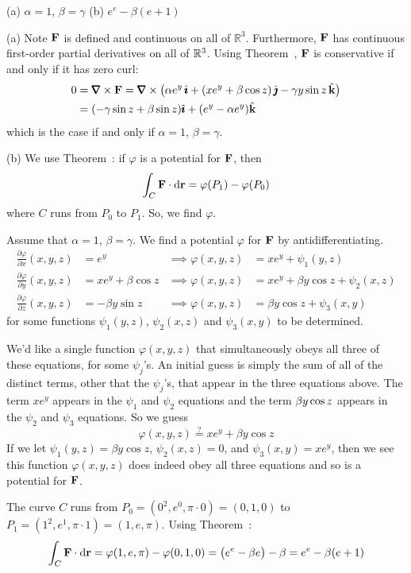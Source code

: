 \begin{answer} 
(a) $\alpha=1$, $\beta=\gamma$\qquad
(b) $e^e-\beta(e+1)$
\end{answer}


\begin{solution}
(a)
Note $\mathbf{F}$ is defined and continuous on all of $\mathbb R^3$. Furthermore, $\mathbf{F}$ has continuous first-order partial derivatives on all of $\mathbb{R}^3$. Using Theorem~, $\mathbf{F}$ is conservative if
and only if it has zero curl:
\begin{align*}
0&=\vnabla\times\vF
=\vnabla\times\big(\alpha e^y\,\hi+(xe^y+\beta\cos z)\,\hj
                   -\gamma y\sin z\,\hk\big) \\
&=(-\gamma\sin z+\beta\sin z)\hi+(e^y-\alpha e^y)\hk
\end{align*}
which is the case if and only if $\alpha=1$, $\beta=\gamma$.

(b)
We use Theorem~: if $\varphi$ is a potential for $\mathbf{F}$, then 
\[ \int_C \mathbf{F} \cdot \mathrm{d}\mathbf{r}  =  \varphi(P_1)-\varphi(P_0) \]
where $C$ runs from $P_0$ to $P_1$. So, we find $\varphi$.

 Assume that $\alpha=1$, $\beta=\gamma$.
We find a potential $\varphi$ for $\mathbf{F}$ by antidifferentiating.
\begin{align*}
\frac{\partial \varphi}{\partial x}(x,y,z) 
            &= e^y & \implies \varphi(x,y,z) &=xe^y+\psi_1(y,z)\\
\frac{\partial \varphi}{\partial y}(x,y,z) &= xe^y+\beta\cos z  & \implies \varphi(x,y,z) &=xe^y+\beta y \cos z + \psi_2(x,z)\\
\frac{\partial \varphi}{\partial z}(x,y,z) &= -\beta y\sin z & \implies \varphi(x,y,z) &=\beta y \cos z + \psi_3(x,y)
\end{align*}
for some functions $\psi_1(y,z)$, $\psi_2(x,z)$ and $\psi_3(x,y)$
to be determined.

We'd like a single  function $\varphi(x,y,z)$ that simultaneously obeys all three of these equations, for some $\psi_j$'s. An initial guess is simply 
the sum of all of the distinct terms, other that the $\psi_j$'s, 
that appear in the three equations above. The term $xe^y$ appears in 
the $\psi_1$ and $\psi_2$ equations and the term $\beta y\cos z$ appears 
in the $\psi_2$ and $\psi_3$ equations. So we guess
\[\varphi(x,y,z)\stackrel{?}{=} xe^y+\beta y \cos z \]
If we let $\psi_1(y,z)=\beta y \cos z$, $\psi_2(x,z)=0$, and $\psi_3(x,y)=xe^y$, then we see this function $\varphi(x,y,z)$ does indeed 
obey all three equations and so is a potential for $\mathbf{F}$.

The curve $C$ runs from $P_0=(0^2,e^0,\pi\cdot0)=(0,1,0)$ to $P_1=(1^2,e^1,\pi\cdot 1)=(1,e,\pi)$.
Using Theorem~:
\[ 
\int_C \mathbf{F} \cdot \mathrm{d}\mathbf{r}  =   \varphi(1,e,\pi)-\varphi(0,1,0) = \big(e^e-\beta e\big)-\beta =e^e-\beta(e+1)
\] 
\end{solution}



